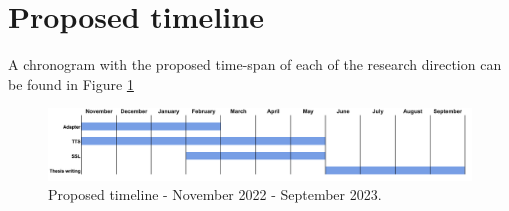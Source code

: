 \section{Proposed timeline}
\label{secction:timeline}

A chronogram with the proposed time-span of each of the research direction can be found in Figure \ref{fig:timeline}
\begin{figure}[ht]
    \centering
    \includegraphics[width=1\textwidth]{imgs/Timeline.png}
    \caption{Proposed timeline - November 2022 - September 2023.}
    \label{fig:timeline}
\end{figure}